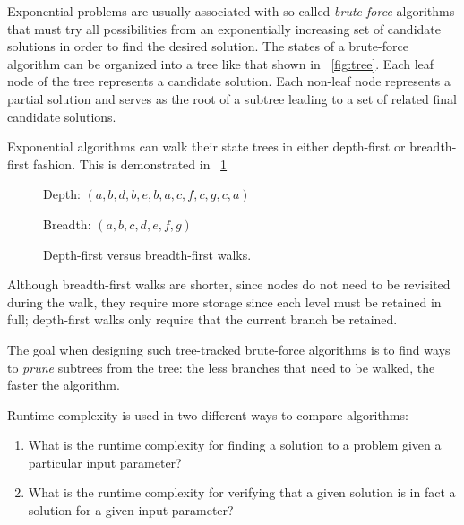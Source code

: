 Exponential problems are usually associated with so-called \emph{brute-force} algorithms that must try all
possibilities from an exponentially increasing set of candidate solutions in order to find the desired solution.
The states of a brute-force algorithm can be organized into a tree like that shown in \figurename~\ref{fig:tree}.
Each leaf node of the tree represents a candidate solution.  Each non-leaf node represents a partial solution and
serves as the root of a subtree leading to a set of related final candidate solutions.

Exponential algorithms can walk their state trees in either depth-first or breadth-first fashion.  This is
demonstrated in \figurename~\ref{fig:treewalks}

\begin{figure}[H]
  \begin{minipage}{3in}
    \centering
    \caption{Depth-first versus breadth-first walks.}
    \label{fig:treewalks}
  \end{minipage}
  \begin{minipage}{2.5in}
    Depth: \((a,b,d,b,e,b,a,c,f,c,g,c,a)\)

    Breadth: \((a,b,c,d,e,f,g)\)
  \end{minipage}
\end{figure}

Although breadth-first walks are shorter, since nodes do not need to be revisited during the walk, they require
more storage since each level must be retained in full; depth-first walks only require that the current branch be
retained.

The goal when designing such tree-tracked brute-force algorithms is to find ways to \emph{prune} subtrees from the
tree: the less branches that need to be walked, the faster the algorithm.

Runtime complexity is used in two different ways to compare algorithms:
\begin{enumerate}
\item What is the runtime complexity for finding a solution to a problem given a particular input parameter?
\item What is the runtime complexity for verifying that a given solution is in fact a solution for a given
  input parameter?
\end{enumerate}

